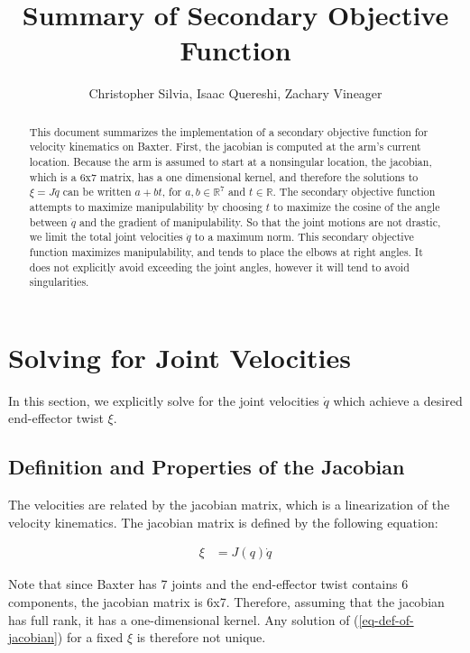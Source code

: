 \documentclass{article}
\begin{document}
\title{Summary of Secondary Objective Function}
\author{Christopher Silvia, Isaac Quereshi, Zachary Vineager}

\maketitle

\begin{abstract}
This document summarizes the implementation of a secondary objective
	function for velocity kinematics on Baxter.
First, the jacobian is computed at the arm's current location.
Because the arm is assumed to start at a nonsingular location, the jacobian,
	which is a 6x7 matrix, has a one dimensional kernel, and therefore
	the solutions to $\xi = J \dot{q}$ can be written $a + b t$,
	for $a, b \in \mathbb{R}^7$ and $t \in \mathbb{R}$.
The secondary objective function attempts to maximize manipulability
	by choosing $t$ to maximize the cosine of the angle between 
	$\dot{q}$ and the gradient of manipulability.
So that the joint motions are not drastic, we limit the total joint velocities
	$\dot{q}$ to a maximum norm.
This secondary objective function maximizes manipulability, and tends to place
	the elbows at right angles.
It does not explicitly avoid exceeding the joint angles, however it will tend
	to avoid singularities.
\end{abstract}

\section{Solving for Joint Velocities}

In this section, we explicitly solve for the joint velocities $\dot{q}$ which
	achieve a desired end-effector twist $\xi$.

\subsection{Definition and Properties of the Jacobian}

The velocities are related by the jacobian matrix, which is a linearization
	of the velocity kinematics.
The jacobian matrix is defined by the following equation:

\begin{align}
	\xi & = J(q) \dot{q} \label{eq-def-of-jacobian}
\end{align}

Note that since Baxter has 7 joints and the end-effector twist contains 6
	components, the jacobian matrix is 6x7.
Therefore, assuming that the jacobian has full rank, it has a one-dimensional
	kernel.
Any solution of (\ref{eq-def-of-jacobian}) for a fixed $\xi$ is therefore
	not unique.
\end{document}
